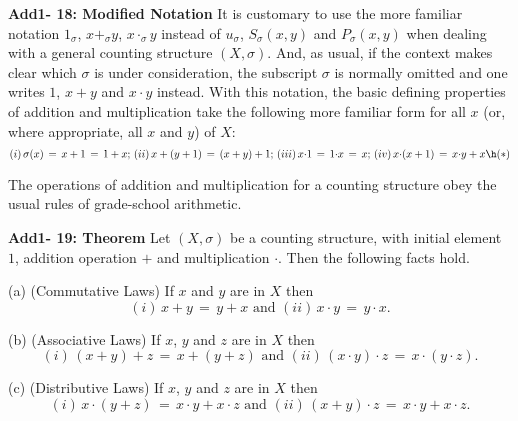 \V
\V

        {\bf Add1- 18: Modified Notation} It is customary to use the more familiar notation $1_{{\sigma}}$, $x+_{{\sigma}}y$, $x{\cdot}_{{\sigma}}y$
    instead of $u_{{\sigma}}$, $S_{{\sigma}}(x,y)$ and $P_{{\sigma}}(x,y)$ when dealing with a general counting structure $(X,{\sigma})$.
    And, as usual, if the context makes clear which ${\sigma}$ is under consideration, the subscript ${\sigma}$ is normally omitted and one writes $1$, $x+y$ and $x{\cdot}y$ instead.
    With this notation, the basic defining properties of addition and multiplication take the following more familiar form for all $x$ (or, where appropriate, all $x$ and $y$) of $X$:
        \begin{displaymath}
        (i)\, {\sigma}(x) \,=\, x+1 \,=\, 1+x;\, (ii)\, x+(y+1) \,=\, (x+y)+1; \, (iii)\, x{\cdot}1 \,=\, 1{\cdot}x \,=\, x; \, (iv)\, x{\cdot}(x+1) \,=\, x{\cdot}y+x \h ({\ast})
        \end{displaymath}

\V
\V

        The operations of addition and multiplication for a counting structure obey the usual rules of grade-school arithmetic.

\V

        {\bf Add1- 19: Theorem} Let $(X,{\sigma})$ be a counting structure, with initial element $1$, addition operation $+$ and multiplication ${\cdot}$.
    Then the following facts hold.

\V

        (a) (Commutative Laws) If $x$ and $y$  are in $X$  then
        \begin{displaymath}
        (i)\, x+y \,=\, y+x \mbox{ and } (ii)\, x{\cdot}y \,=\, y{\cdot}x.
        \end{displaymath}


\V

        (b) (Associative Laws) If $x$, $y$ and $z$ are in $X$  then
        \begin{displaymath}
        (i)\, (x+y)+z \,=\, x+(y+z) \mbox{ and } (ii)\, (x{\cdot}y){\cdot}z \,=\, x{\cdot}(y{\cdot}z).
        \end{displaymath}


\V

        (c) (Distributive Laws) If $x$, $y$ and $z$ are in $X$ then
        \begin{displaymath}
        (i)\, x{\cdot}(y+z) \,=\, x{\cdot}y + x{\cdot}z \mbox{ and } (ii)\, (x+y){\cdot}z \,=\, x{\cdot}y + x{\cdot}z.
        \end{displaymath}



